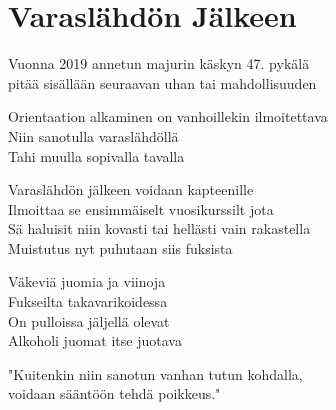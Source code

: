\section{Varaslähdön Jälkeen}
Vuonna 2019 annetun majurin käskyn 47. pykälä\\
pitää sisällään seuraavan uhan tai mahdollisuuden

Orientaation alkaminen on vanhoillekin ilmoitettava\\
Niin sanotulla varaslähdöllä\\
Tahi muulla sopivalla tavalla

Varaslähdön jälkeen voidaan kapteenille\\
Ilmoittaa se ensimmäiselt vuosikurssilt jota\\
Sä haluisit niin kovasti tai hellästi vain rakastella\\
Muistutus nyt puhutaan siis fuksista

Väkeviä juomia ja viinoja\\
Fukseilta takavarikoidessa\\
On pulloissa jäljellä olevat\\
Alkoholi juomat itse juotava

"Kuitenkin niin sanotun vanhan tutun kohdalla,\\
voidaan sääntöön tehdä poikkeus."